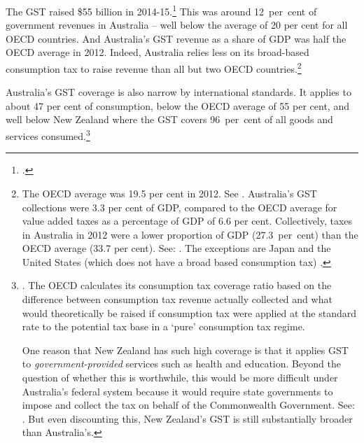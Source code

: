 The GST raised \$55 billion in 2014-15.\footcite[][5]{Treasury2015FinalBudgetOutcome1415}  This was around 12~per~cent of government revenues in Australia – well below the average of 20 per cent for all OECD countries.  And Australia’s GST revenue as a share of GDP was half the OECD average in 2012. Indeed, Australia relies less on its broad-based consumption tax to raise revenue than all but two OECD countries.\footnote{The OECD average was 19.5 per cent in 2012. See \textcite{OECD2014}. Australia’s GST collections were 3.3 per cent of GDP, compared to the OECD average for value added taxes as a percentage of GDP of 6.6 per cent. Collectively, taxes in Australia in 2012 were a lower proportion of GDP (27.3~per~cent) than the OECD average (33.7 per cent). See: \textcite{OECD2015b}.
The exceptions are Japan and the United States (which does not have a broad based consumption tax) \textcite[][40]{OECD2014}.}

Australia’s GST coverage is also narrow by international standards. It applies to about 47 per cent of consumption, below the OECD average of 55 per cent,   and well below New Zealand where the GST covers 96~per~cent of all goods and services consumed.\footnote{\textcite[][95]{OECD2014}. The OECD calculates its consumption tax coverage ratio based on the difference between consumption tax revenue actually collected and what would theoretically be raised if consumption tax were applied at the standard rate to the potential tax base in a ‘pure’ consumption tax regime.

One reason that New Zealand has such high coverage is that it applies GST to \emph{government-provided} services such as health and education. Beyond the question of whether this is worthwhile, this would be more difficult under Australia’s federal system because it would require state governments to impose and collect the tax on behalf of the Commonwealth Government. See: \textcite{Millar2015}. But even discounting this, New Zealand’s GST is still substantially broader than Australia’s.}  

